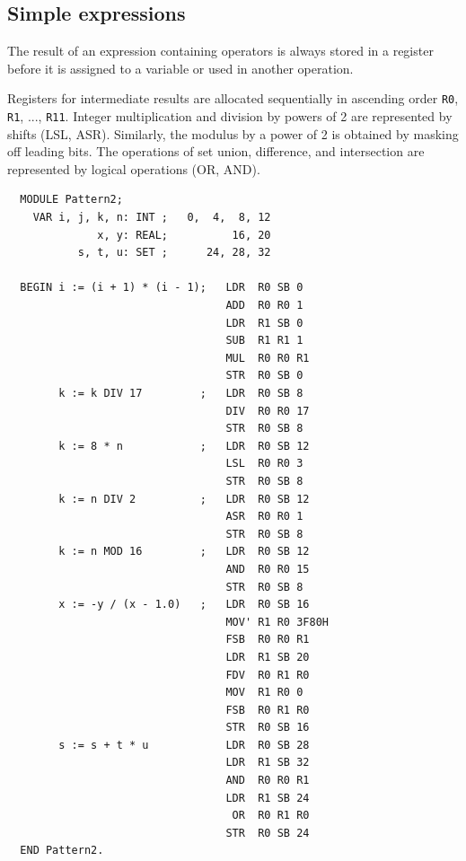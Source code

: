 \subsection{Simple expressions}
The result of an expression containing operators is always stored in a register before it is assigned
to a variable or used in another operation.

Registers for intermediate results are allocated sequentially in ascending order \verb|R0|, \verb|R1|,
..., \verb|R11|.  Integer multiplication and division by powers of 2 are represented by shifts (LSL,
ASR). Similarly, the modulus by a power of 2 is obtained by masking off leading bits. The operations
of set union, difference, and intersection are represented by logical operations (OR, AND).
\begin{verbatim}
  MODULE Pattern2;
    VAR i, j, k, n: INT ;   0,  4,  8, 12
              x, y: REAL;          16, 20
           s, t, u: SET ;      24, 28, 32
  
  BEGIN i := (i + 1) * (i - 1);   LDR  R0 SB 0
                                  ADD  R0 R0 1
                                  LDR  R1 SB 0
                                  SUB  R1 R1 1
                                  MUL  R0 R0 R1
                                  STR  R0 SB 0
        k := k DIV 17         ;   LDR  R0 SB 8
                                  DIV  R0 R0 17
                                  STR  R0 SB 8
        k := 8 * n            ;   LDR  R0 SB 12
                                  LSL  R0 R0 3
                                  STR  R0 SB 8
        k := n DIV 2          ;   LDR  R0 SB 12
                                  ASR  R0 R0 1
                                  STR  R0 SB 8
        k := n MOD 16         ;   LDR  R0 SB 12
                                  AND  R0 R0 15
                                  STR  R0 SB 8
        x := -y / (x - 1.0)   ;   LDR  R0 SB 16
                                  MOV' R1 R0 3F80H
                                  FSB  R0 R0 R1
                                  LDR  R1 SB 20
                                  FDV  R0 R1 R0
                                  MOV  R1 R0 0
                                  FSB  R0 R1 R0
                                  STR  R0 SB 16
        s := s + t * u            LDR  R0 SB 28
                                  LDR  R1 SB 32
                                  AND  R0 R0 R1 
                                  LDR  R1 SB 24
                                   OR  R0 R1 R0
                                  STR  R0 SB 24
  END Pattern2.
\end{verbatim}

